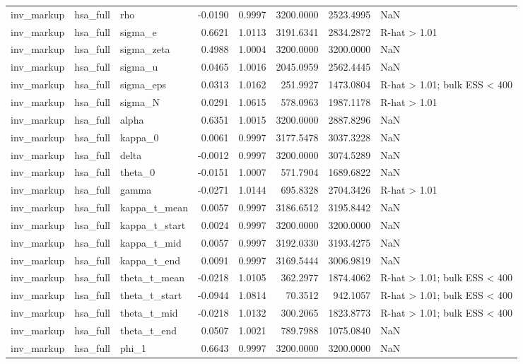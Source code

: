 \begin{tabular}{lllrrrrl}
inv\_markup & hsa\_full & rho & -0.0190 & 0.9997 & 3200.0000 & 2523.4995 & NaN \\
inv\_markup & hsa\_full & sigma\_e & 0.6621 & 1.0113 & 3191.6341 & 2834.2872 & R-hat > 1.01 \\
inv\_markup & hsa\_full & sigma\_zeta & 0.4988 & 1.0004 & 3200.0000 & 3200.0000 & NaN \\
inv\_markup & hsa\_full & sigma\_u & 0.0465 & 1.0016 & 2045.0959 & 2562.4445 & NaN \\
inv\_markup & hsa\_full & sigma\_eps & 0.0313 & 1.0162 & 251.9927 & 1473.0804 & R-hat > 1.01; bulk ESS < 400 \\
inv\_markup & hsa\_full & sigma\_N & 0.0291 & 1.0615 & 578.0963 & 1987.1178 & R-hat > 1.01 \\
inv\_markup & hsa\_full & alpha & 0.6351 & 1.0015 & 3200.0000 & 2887.8296 & NaN \\
inv\_markup & hsa\_full & kappa\_0 & 0.0061 & 0.9997 & 3177.5478 & 3037.3228 & NaN \\
inv\_markup & hsa\_full & delta & -0.0012 & 0.9997 & 3200.0000 & 3074.5289 & NaN \\
inv\_markup & hsa\_full & theta\_0 & -0.0151 & 1.0007 & 571.7904 & 1689.6822 & NaN \\
inv\_markup & hsa\_full & gamma & -0.0271 & 1.0144 & 695.8328 & 2704.3426 & R-hat > 1.01 \\
inv\_markup & hsa\_full & kappa\_t\_mean & 0.0057 & 0.9997 & 3186.6512 & 3195.8442 & NaN \\
inv\_markup & hsa\_full & kappa\_t\_start & 0.0024 & 0.9997 & 3200.0000 & 3200.0000 & NaN \\
inv\_markup & hsa\_full & kappa\_t\_mid & 0.0057 & 0.9997 & 3192.0330 & 3193.4275 & NaN \\
inv\_markup & hsa\_full & kappa\_t\_end & 0.0091 & 0.9997 & 3169.5444 & 3006.9819 & NaN \\
inv\_markup & hsa\_full & theta\_t\_mean & -0.0218 & 1.0105 & 362.2977 & 1874.4062 & R-hat > 1.01; bulk ESS < 400 \\
inv\_markup & hsa\_full & theta\_t\_start & -0.0944 & 1.0814 & 70.3512 & 942.1057 & R-hat > 1.01; bulk ESS < 400 \\
inv\_markup & hsa\_full & theta\_t\_mid & -0.0218 & 1.0132 & 300.2065 & 1823.8773 & R-hat > 1.01; bulk ESS < 400 \\
inv\_markup & hsa\_full & theta\_t\_end & 0.0507 & 1.0021 & 789.7988 & 1075.0840 & NaN \\
inv\_markup & hsa\_full & phi\_1 & 0.6643 & 0.9997 & 3200.0000 & 3200.0000 & NaN \\

\end{tabular}
